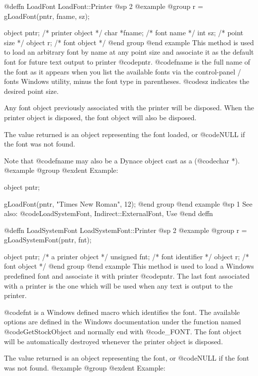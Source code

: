 @deffn {LoadFont} LoadFont::Printer
@sp 2
@example
@group
r = gLoadFont(pntr, fname, sz);

object   pntr;  /*  printer object   */
char    *fname; /*  font name        */
int      sz;    /*  point size       */
object   r;     /*  font object      */
@end group
@end example
This method is used to load an arbitrary font by name at any point size
and associate it as the default font for future text output to printer
@code{pntr}.  @code{fname} is the full name of the font as it appears
when you list the available fonts via the control-panel / fonts Windows
utility, minus the font type in parentheses.  @code{sz} indicates the
desired point size.

Any font object previously associated with the printer will be
disposed.  When the printer object is disposed, the font object
will also be disposed.

The value returned is an object representing the font loaded, or
@code{NULL} if the font was not found.

Note that @code{fname} may also be a Dynace object cast as a (@code{char *}).
@example
@group
@exdent Example:

object  pntr;

gLoadFont(pntr, "Times New Roman", 12);
@end group
@end example
@sp 1
See also:  @code{LoadSystemFont, Indirect::ExternalFont, Use}
@end deffn














@deffn {LoadSystemFont} LoadSystemFont::Printer
@sp 2
@example
@group
r = gLoadSystemFont(pntr, fnt);

object   pntr;  /*  a printer object  */
unsigned fnt;   /*  font identifier  */
object   r;     /*  font object      */
@end group
@end example
This method is used to load a Windows predefined font and associate it
with printer @code{pntr}.  The last font associated with a printer is the
one which will be used when any text is output to the printer.

@code{fnt} is a Windows defined macro which identifies the font.  The
available options are defined in the Windows documentation under the
function named @code{GetStockObject} and normally end with @code{_FONT}.
The font object will be automatically destroyed whenever the printer
object is disposed.

The value returned is an object representing the font, or
@code{NULL} if the font was not found.
@example
@group
@exdent Example:

